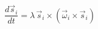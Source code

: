 \documentclass[preview]{standalone}
\begin{document}
\begin{varwidth}{50in}
  \begin{equation}
    \frac{d \vec{s}_{i}}{dt} = \lambda\, \vec{s}_{i} \times\left( \vec{\omega}_{i} \times\vec{s}_{i} \right)
    \nonumber
  \end{equation}
\end{varwidth}
\end{document}
